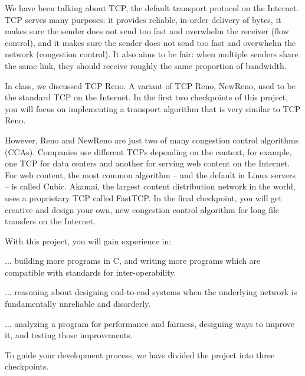 
We have been talking about TCP, the default transport protocol on the Internet. TCP serves many purposes: it provides reliable, in-order delivery of bytes, it makes sure the sender does not send too fast and overwhelm the receiver (flow control), and it makes sure the sender does not send too fast and overwhelm the network (congestion control). It also aims to be fair: when multiple senders share the same link, they should receive roughly the same proportion of bandwidth.

In class, we discussed TCP Reno. A variant of TCP Reno, NewReno, used to be the standard TCP on the Internet. In the first two checkpoints of this project, you will focus on implementing a transport algorithm that is very similar to TCP Reno. 


However, Reno and NewReno are just two of many congestion control algorithms (CCAs). Companies use different TCPs depending on the context, for example, one TCP for data centers and another for serving web content on the Internet.
For web content, the most common algorithm -- and the default in Linux servers -- is called Cubic. Akamai, the largest content distribution network in the world, uses a proprietary TCP called FastTCP. In the final checkpoint, you will get creative and design your own, new congestion control algorithm for long file transfers on the Internet.

\vspace{5pt}

\noindent With this project, you will gain experience in:
\begin{packed_itemize}
  \item ... building more programs in C, and writing more programs which are compatible with standards for inter-operability.
  \item ... reasoning about designing end-to-end systems when the underlying network is fundamentally unreliable and disorderly.
  \item ... analyzing a program for performance and fairness, designing ways to improve it, and testing those improvements. 
\end{packed_itemize}

\noindent To guide your development process, we have divided the project into three checkpoints.

